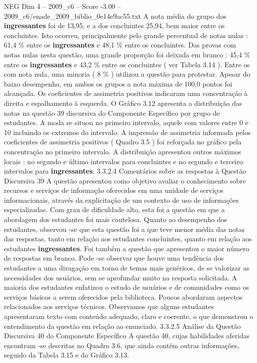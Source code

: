 \begin{textsample}{NEG Dim 4 – 2009\_c6 – Score -3.00 – 2009\_c6/enade\_2009\_biblio\_0e14e9ac55.txt}
A nota média do grupo dos \textbf{ingressantes} foi de 13,95, e a dos concluintes 25,94, bem maior entre os concluintes.
Isto ocorreu, principalmente pelo grande percentual de notas nulas : 61,4 \% entre os \textbf{ingressantes} e 48,1 \% entre os concluintes.
Das provas com notas nulas nesta questão, uma grande proporção foi deixada em branco : 45,4 \% entre os \textbf{ingressantes} e 43,2 \% entre os concluintes ( ver Tabela 3.14 ).
Entre os com nota nula, uma minoria ( 8 \% ) utilizou a questão para protestar.
Apesar do baixo desempenho, em ambos os grupos a nota máxima de 100,0 pontos foi alcançada.
Os coeficientes de assimetria positivos indicaram uma concentração à direita e espalhamento à esquerda.
O Gráfico 3.12 apresenta a distribuição das notas na questão 39 discursiva do Componente Específico por grupo de estudantes.
A moda se situou no primeiro intervalo, aquele com valores entre 0 e 10 incluindo os extremos do intervalo.
A impressão de assimetria informada pelos coeficientes de assimetria positivos ( Quadro 3.5 ) foi reforçada no gráfico pela concentração no primeiro intervalo.
A distribuição apresentou outros máximos locais : no segundo e último intervalos para concluintes e no segundo e terceiro intervalos para \textbf{ingressantes}. 3.3.2.4 Comentários sobre as respostas à Questão Discursiva 39 A questão apresentou como objetivo avaliar o conhecimento sobre recursos e serviços de informação oferecidos em uma unidade de serviços informacionais, através da explicitação de um contexto de uso de informações especializadas.
Com grau de dificuldade alto, esta foi a questão em que a abordagem dos estudantes foi mais cautelosa.
Quanto ao desempenho dos estudantes, observou -se que esta questão foi a que teve menor média das notas das respostas, tanto em relação aos estudantes concluintes, quanto em relação aos estudantes \textbf{ingressantes}.
Foi também a questão que apresentou o maior número de respostas em branco.
Pode -se observar que houve uma tendência dos estudantes a uma divagação em torno de temas mais genéricos, de se valorizar as necessidades dos usuários, sem se aprofundar muito na resposta solicitada.
A maioria dos estudantes enfatizou o estudo de usuários e de comunidades como os serviços básicos a serem oferecidos pela biblioteca.
Poucos abordaram aspectos relacionados aos serviços técnicos.
Observamos que alguns estudantes apresentaram texto com conteúdo adequado, claro e coerente, o que demonstrou o entendimento da questão em relação ao enunciado. 3.3.2.5 Análise da Questão Discursiva 40 do Componente Específico A questão 40, cujas habilidades aferidas encontram -se descritas no Quadro 3.6, que ainda contém outras informações, seguido da Tabela 3.15 e do Gráfico 3.13.

\end{textsample}
